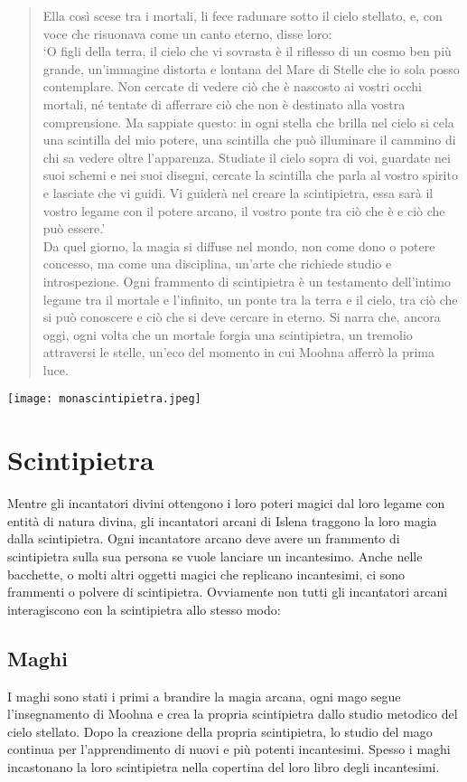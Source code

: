 \documentclass[a4paper]{report}
\begin{document}
\begin{multicols}{2}
\begin{verse}
{Ella così scese tra i mortali, li fece radunare sotto il cielo stellato, e, con voce che risuonava come un canto eterno, disse loro:\\
\enquote*{O figli della terra, il cielo che vi sovrasta è il riflesso di un cosmo ben più grande, un’immagine distorta e lontana del Mare di Stelle che io sola posso contemplare. Non cercate di vedere ciò che è nascosto ai vostri occhi mortali, né tentate di afferrare ciò che non è destinato alla vostra comprensione. Ma sappiate questo: in ogni stella che brilla nel cielo si cela una scintilla del mio potere, una scintilla che può illuminare il cammino di chi sa vedere oltre l’apparenza. Studiate il cielo sopra di voi, guardate nei suoi schemi e nei suoi disegni, cercate la scintilla che parla al vostro spirito e lasciate che vi guidi. Vi guiderà nel creare la scintipietra, essa sarà il vostro legame con il potere arcano, il vostro ponte tra ciò che è e ciò che può essere.}\\
Da quel giorno, la magia si diffuse nel mondo, non come dono o potere concesso, ma come una disciplina, un’arte che richiede studio e introspezione. Ogni frammento di scintipietra è un testamento dell’intimo legame tra il mortale e l’infinito, un ponte tra la terra e il cielo, tra ciò che si può conoscere e ciò che si deve cercare in eterno.
Si narra che, ancora oggi, ogni volta che un mortale forgia una scintipietra, un tremolio attraversi le stelle, un’eco del momento in cui Moohna afferrò la prima luce.}
\end{verse}

\texttt{[image: monascintipietra.jpeg]}

\section{Scintipietra}
Mentre gli incantatori divini ottengono i loro poteri magici dal loro legame con entità di natura divina, gli incantatori arcani di Islena traggono la loro magia dalla scintipietra. Ogni incantatore arcano deve avere un frammento di scintipietra sulla sua persona se vuole lanciare un incantesimo. Anche nelle bacchette, o molti altri oggetti magici che replicano incantesimi, ci sono frammenti o polvere di scintipietra. Ovviamente non tutti gli incantatori arcani interagiscono con la scintipietra allo stesso modo:

\subsection*{Maghi}
I maghi sono stati i primi a brandire la magia arcana, ogni mago segue l'insegnamento di Moohna e crea la propria scintipietra dallo studio metodico del cielo stellato. Dopo la creazione della propria scintipietra, lo studio del mago continua per l'apprendimento di nuovi e più potenti incantesimi. Spesso i maghi incastonano la loro scintipietra nella copertina del loro libro degli incantesimi.
	

\end{multicols}
\end{document}

